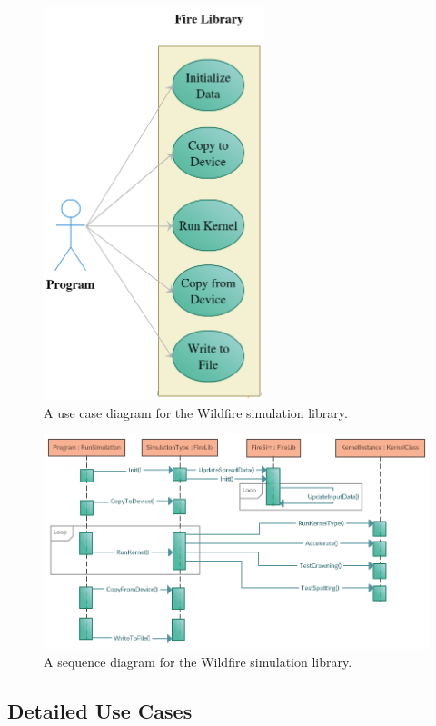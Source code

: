 \begin{figure}
    \centering
    \includegraphics[height=4.5in,width=\textwidth,keepaspectratio]{figures/design/use_case_diagram.png}
    \caption{A use case diagram for the Wildfire simulation library.}
    \label{fig:usecase_diagram}
\end{figure}

\begin{figure}
    \centering
    \includegraphics[height=\textheight,width=\textwidth,keepaspectratio]{figures/design/sequence_diagram.png}
    \caption{A sequence diagram for the Wildfire simulation library.}
    \label{fig:sequence_diagram}
\end{figure}

\subsection{Detailed Use Cases}
